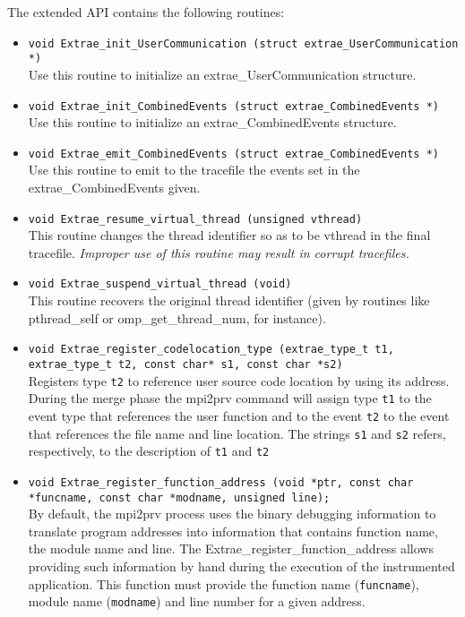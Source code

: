 The extended API contains the following routines:
\begin{itemize}

	\item {\tt void Extrae\_init\_UserCommunication (struct extrae\_UserCommunication *)}\\
	Use this routine to initialize an extrae\_UserCommunication structure.
	\item {\tt void Extrae\_init\_CombinedEvents (struct extrae\_CombinedEvents *)}\\
	Use this routine to initialize an extrae\_CombinedEvents structure.
	\item {\tt void Extrae\_emit\_CombinedEvents (struct extrae\_CombinedEvents *)}\\
	Use this routine to emit to the tracefile the events set in the extrae\_CombinedEvents given.
	\item {\tt void Extrae\_resume\_virtual\_thread (unsigned vthread)}\\
	This routine changes the thread identifier so as to be vthread in the final tracefile. {\em Improper use of this routine may result in corrupt tracefiles.}
	\item {\tt void Extrae\_suspend\_virtual\_thread (void)}\\
	This routine recovers the original thread identifier (given by routines like pthread\_self or omp\_get\_thread\_num, for instance).
	\item {\tt void Extrae\_register\_codelocation\_type (extrae\_type\_t t1, extrae\_type\_t t2, const char* s1, const char *s2)}\\
	Registers type {\tt t2} to reference user source code location by using its address. During the merge phase the mpi2prv command will assign type {\tt t1} to the event type that references the user function and to the event {\tt t2} to the event that references the file name and line location. The strings {\tt s1} and {\tt s2} refers, respectively, to the description of {\tt t1} and {\tt t2}
	\item {\tt void Extrae\_register\_function\_address (void *ptr, const char *funcname, const char *modname, unsigned line);}\\
	By default, the mpi2prv process uses the binary debugging information to translate program addresses into information that contains function name, the module name and line. The Extrae\_register\_function\_address allows providing such information by hand during the execution of the instrumented application. This function must provide the function name ({\tt funcname}), module name ({\tt modname}) and line number for a given address.

\end{itemize}
